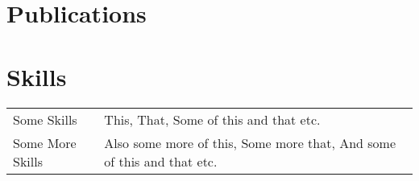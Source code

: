 \documentclass[a4paper,12pt]{article}
\begin{document}
\section{Publications}
\begin{refsection}
\nocite{*}
\printbibliography[heading=none]
\end{refsection}

\section{Skills}
\begin{tabularx}{\linewidth}{@{}l X@{}}
Some Skills &  \normalsize{This, That, Some of this and that etc.}\\
Some More Skills  &  \normalsize{Also some more of this, Some more that, And some of this and that etc.}\\  
\end{tabularx}

\vfill
{}
\end{document}
